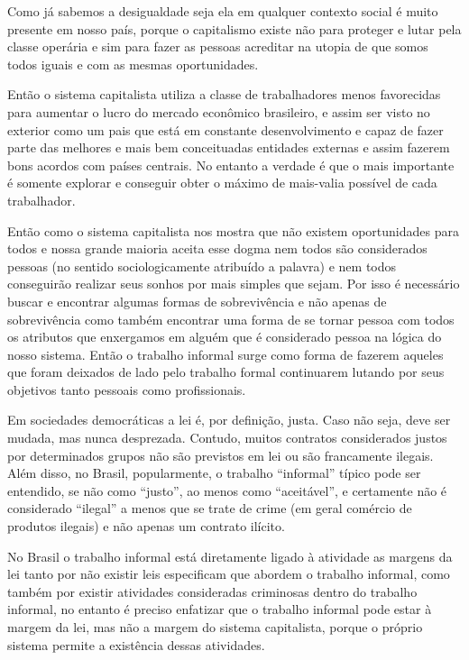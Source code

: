 Como já sabemos a desigualdade seja ela em qualquer contexto social é muito presente em nosso país, porque o 
capitalismo existe não para proteger e lutar pela classe operária e sim para fazer as pessoas acreditar na 
utopia de que somos todos iguais e com as mesmas oportunidades. 

Então o sistema capitalista utiliza a classe 
de trabalhadores menos favorecidas para aumentar o lucro do mercado econômico brasileiro, e assim ser visto 
no exterior como um pais que está em constante desenvolvimento e capaz de fazer parte das melhores e mais 
bem conceituadas entidades externas e assim fazerem bons acordos com países centrais. No entanto a verdade 
é que o mais importante é somente explorar e conseguir obter o máximo de mais-valia possível de cada trabalhador. 

Então como o sistema capitalista nos mostra que não existem oportunidades para todos e nossa grande maioria 
aceita esse dogma nem todos são considerados pessoas (no sentido sociologicamente atribuído a palavra) e nem 
todos conseguirão realizar seus sonhos por mais simples que sejam. Por isso é necessário buscar e encontrar 
algumas formas de sobrevivência e não apenas de sobrevivência como também encontrar uma forma de se tornar 
pessoa com todos os atributos que enxergamos em alguém que é considerado pessoa na lógica do nosso sistema. 
Então o trabalho informal surge como forma de fazerem aqueles que foram deixados de lado pelo trabalho 
formal continuarem lutando por seus objetivos tanto pessoais como profissionais.

\begin{citacao}
Em sociedades democráticas a lei é, por definição, justa. Caso não seja, deve ser mudada, mas nunca desprezada. 
Contudo, muitos contratos considerados justos por determinados grupos não são previstos em lei ou são francamente
ilegais. Além disso, no Brasil, popularmente, o trabalho ``informal'' típico pode ser entendido, se não como ``justo'',
ao menos como ``aceitável'', e certamente não é considerado ``ilegal'' a menos que se trate de crime (em geral comércio
de produtos ilegais) e não apenas um contrato ilícito. \cite{noronha2003informal}
\end{citacao}

No Brasil o trabalho informal está diretamente ligado à atividade as margens da lei tanto por não existir leis 
especificam que abordem o trabalho informal, como também por existir atividades consideradas criminosas dentro 
do trabalho informal, no entanto é preciso enfatizar que o trabalho informal pode estar à margem da lei, mas não 
a margem do sistema capitalista, porque o próprio sistema permite a existência dessas atividades. 

